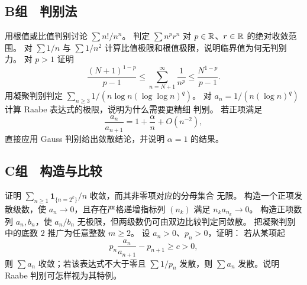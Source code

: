 \subsection*{B组　判别法}
\begin{enumerate}[label=\textbf{\thechapter.\arabic*.},resume]
  用根值或比值判别讨论
 \(\sum n!/n^n\)。
  判定
 \(\sum n^p r^n\) 对 \(p\in\mathbb{R}\)、\(r\in\mathbb{R}\) 的绝对收敛范围。
  对 \(\sum1/n\) 与
 \(\sum1/n^2\) 计算比值极限和根值极限，说明临界值为何无判别力。
  对 \(p>1\) 证明
 \[
 \frac{(N+1)^{1-p}}{p-1}
 \le\sum_{n=N+1}^\infty\frac1{n^p}
 \le\frac{N^{1-p}}{p-1}.
 \]
  用凝聚判别判定
 \(\sum_{n\ge3}1/(n\log n(\log\log n)^q)\)。
  对
 \(a_n=1/(n(\log n)^q)\) 计算 Raabe 表达式的极限，说明为什么需要更精细
 判别。
  若正项满足
 \[
 \frac{a_n}{a_{n+1}}
 =1+\frac{\alpha}{n}+O(n^{-2}),
 \]
 直接应用 Gauss 判别给出敛散结论，并说明 \(\alpha=1\) 的结果。
\end{enumerate}

\subsection*{C组　构造与比较}
\begin{enumerate}[label=\textbf{\thechapter.\arabic*.},resume]
  证明
 \(\sum_{n\ge1}\mathbf1_{\{n=2^k\}}/n\) 收敛，而其非零项对应的分母集合
 无限。
  构造一个正项发散级数，使
 \(a_n\to0\)，且存在严格递增指标列 \((n_k)\) 满足
 \(n_ka_{n_k}\to0\)。
  构造正项数列
 \(a_n,b_n\)，使 \(a_n/b_n\) 无极限，但两级数仍可由双边比较判定同敛散。
  把凝聚判别中的底数 \(2\)
 推广为任意整数 \(m\ge2\)。
  设 \(a_n>0\)、\(p_n>0\)，证明：
 若从某项起
 \[
  p_n\frac{a_n}{a_{n+1}}-p_{n+1}\ge c>0,
 \]
 则 \(\sum a_n\) 收敛；若该表达式不大于零且 \(\sum1/p_n\) 发散，则
 \(\sum a_n\) 发散。说明 Raabe 判别可怎样视为其特例。
\end{enumerate}

